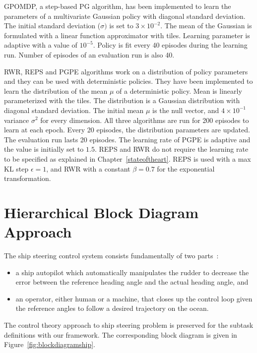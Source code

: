 GPOMDP, a step-based PG algorithm, has been implemented to learn the parameters of a multivariate Gaussian policy with diagonal standard deviation. The initial standard deviation ($\sigma)$ is set to $3\times10^{-2}$. The mean of the Gaussian is formulated with a linear function approximator with tiles. Learning parameter is adaptive with a value of $10^{-5}$. Policy is fit every 40 episodes during the learning run. Number of episodes of an evaluation run is also 40. 

RWR, REPS and PGPE algorithms work on a distribution of policy parameters and they can be used with deterministic policies. They have been implemented to learn the distribution of the mean $\mu$ of a deterministic policy. Mean is linearly parameterized with the tiles. The distribution is a Gaussian distribution with diagonal standard deviation. The initial mean $\mu$ is the null vector, and $4\times10^{-1}$ variance $\sigma^2$ for every dimension. All three algorithms are run for 200 episodes to learn at each epoch. Every 20 episodes, the distribution parameters are updated. The evaluation run lasts 20 episodes. The learning rate of PGPE is adaptive and the value is initially set to $1.5$. REPS and RWR do not require the learning rate to be specified as explained in Chapter~\ref{stateoftheart}. REPS is used with a max KL step $\epsilon = 1$, and RWR with a constant $\beta = 0.7$ for the exponential transformation. 

\section{Hierarchical Block Diagram Approach}

The ship steering control system consists fundamentally of two parts~\cite{shipsteeringACD}:
 
\begin{itemize}
   \item a ship autopilot which automatically manipulates the rudder to decrease the error between the reference heading angle and the actual heading angle, and
   \item an operator, either human or a machine, that closes up the control loop given the reference angles to follow a desired trajectory on the ocean.
\end{itemize}

The control theory approach to ship steering problem is preserved for the subtask definitions with our framework. The corresponding block diagram is given in Figure~\ref{fig:blockdiagramship}. 

